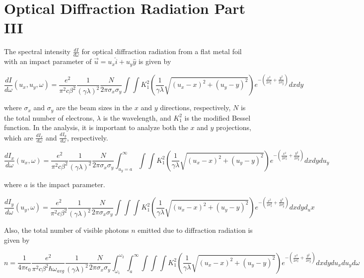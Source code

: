 \documentclass[12pt]{article}
\begin{document}
\section{Optical Diffraction Radiation Part III}

The spectral intensity $\frac{dI}{d \omega}$ for optical diffraction radiation from a flat metal foil with an impact parameter of $\vec{u}=u_x \hat{i}+u_y \hat{y}$ is given by

\begin{equation}
\frac{dI}{d \omega}(u_x,u_y,\omega)=\frac{e^2}{\pi^2 c \beta^2} \frac{1}{(\gamma \lambda)^2} \frac{N}{2 \pi \sigma_x \sigma_y} \int \int K_{1}^{2}(\frac{1}{\gamma \lambda} \sqrt{(u_x-x)^2+(u_y-y)^2}) e^{-(\frac{x^2}{2 \sigma_{x}^{2}}+\frac{y^2}{2 \sigma_{y}^{2}})} dx dy
\end{equation}

where $\sigma_x$ and $\sigma_y$ are the beam sizes in the $x$ and $y$ directions, respectively, $N$ is the total number of electrons, $\lambda$ is the wavelength, and $K_1^{2}$ is the modified Bessel function. In the analysis, it is important to analyze both the $x$ and $y$ projections, which are $\frac{dI_x}{d \omega}$ and $\frac{dI_y}{d \omega}$, respectively.

\begin{equation}
\frac{dI_x}{d \omega}(u_x, \omega)=\frac{e^2}{\pi^2 c \beta^2} \frac{1}{(\gamma \lambda)^2} \frac{N}{2 \pi \sigma_x \sigma_y} \int_{u_y=a}^{\infty} \int \int K_{1}^{2}(\frac{1}{\gamma \lambda} \sqrt{(u_x-x)^2+(u_y-y)^2}) e^{-(\frac{x^2}{2 \sigma_{x}^{2}}+\frac{y^2}{2 \sigma_{y}^{2}})} dx dy du_y
\end{equation}

where $a$ is the impact parameter.

\begin{equation}
\frac{dI_y}{d \omega}(u_y,\omega)=\frac{e^2}{\pi^2 c \beta^2} \frac{1}{(\gamma \lambda)^2} \frac{N}{2 \pi \sigma_x \sigma_y} \int \int \int K_{1}^{2}(\frac{1}{\gamma \lambda} \sqrt{(u_x-x)^2+(u_y-y)^2}) e^{-(\frac{x^2}{2 \sigma_{x}^{2}}+\frac{y^2}{2 \sigma_{y}^{2}})} dx dy d_ux
\end{equation}

Also, the total number of visible photons $n$ emitted due to diffraction radiation is given by

\begin{equation}
n=\frac{1}{4 \pi \epsilon_0} \frac{e^2}{\pi^2 c \beta^2 \hbar \omega_{avg}} \frac{1}{(\gamma \lambda)^2} \frac{N}{2 \pi \sigma_x \sigma_y} \int_{\omega_1}^{\omega_2} \int_{a}^{\infty} \int \int \int K_{1}^{2}(\frac{1}{\gamma \lambda} \sqrt{(u_x-x)^2+(u_y-y)^2}) e^{-(\frac{x^2}{2 \sigma_{x}^{2}}+\frac{y^2}{2 \sigma_{y}^{2}})} dx dy du_x du_y d \omega
\end{equation}
\end{document}
